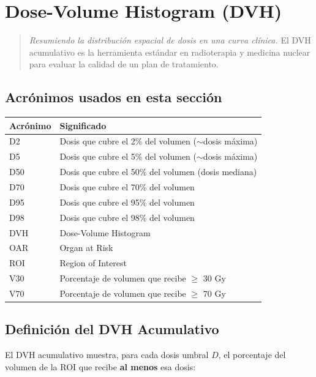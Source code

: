 \documentclass[12pt,a4paper]{article}
\begin{document}
\newpage

\section{Dose-Volume Histogram (DVH)}

\begin{quote}
\textit{Resumiendo la distribución espacial de dosis en una curva clínica.} El DVH acumulativo es la herramienta estándar en radioterapia y medicina nuclear para evaluar la calidad de un plan de tratamiento.
\end{quote}

\subsection*{Acrónimos usados en esta sección}

\begin{tabular}{p{3cm} p{12cm}}
\toprule
\textbf{Acrónimo} & \textbf{Significado} \\
\midrule
D2 & Dosis que cubre el 2\% del volumen ($\sim$dosis máxima) \\
D5 & Dosis que cubre el 5\% del volumen ($\sim$dosis máxima) \\
D50 & Dosis que cubre el 50\% del volumen (dosis mediana) \\
D70 & Dosis que cubre el 70\% del volumen \\
D95 & Dosis que cubre el 95\% del volumen \\
D98 & Dosis que cubre el 98\% del volumen \\
DVH & Dose-Volume Histogram \\
OAR & Organ at Risk \\
ROI & Region of Interest \\
V30 & Porcentaje de volumen que recibe $\geq$ 30 Gy \\
V70 & Porcentaje de volumen que recibe $\geq$ 70 Gy \\
\bottomrule
\end{tabular}

\subsection{Definición del DVH Acumulativo}

El DVH acumulativo muestra, para cada dosis umbral $D$, el porcentaje del volumen de la ROI que recibe \textbf{al menos} esa dosis:
\end{document}
